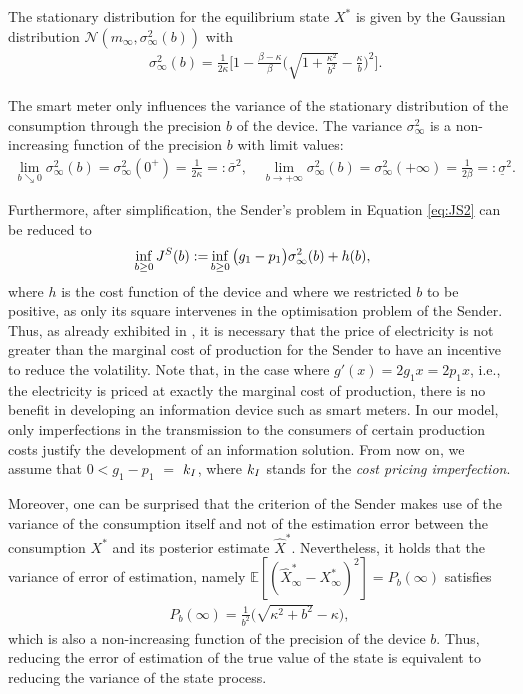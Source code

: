 \documentclass[a4paper,10pt]{article}
\theoremstyle{definition}
\theoremstyle{plain}
\numberwithin{equation}{section}
\begin{document}
\medskip

The stationary distribution for the equilibrium state $X^*$ is given by the Gaussian distribution $\mathcal{N}(m_\infty, \sigma_\infty^2(b))$ with
\begin{align}
 & \sigma_\infty^2(b) = \frac{1}{2\kappa} \Big[1-\frac{\beta-\kappa}{\beta}\Big(\sqrt{1 + \frac{\kappa^2}{b^2}} -  \frac{\kappa}{b}\Big)^2\Big].
\end{align}

The smart meter only influences the variance of the stationary distribution of the consumption through the precision $b$ of the device. The variance $\sigma_\infty^2$ is a non-increasing function of the precision $b$ with limit values: 
\begin{align}\label{eq:sigmalim}
	\lim_{b\searrow0}\sigma_\infty^2(b)=\sigma_\infty^2(0^+) = \frac{1}{2\kappa} =: \bar\sigma^2, 
	\quad 
	\lim_{b\to+\infty}\sigma_\infty^2(b)=\sigma_\infty^2(+\infty) =  \frac{1}{2\beta} =: \underline\sigma^2. 
\end{align}

Furthermore, after simplification, the Sender's problem in Equation \eqref{eq:JS2} can be reduced to
\begin{align}\label{eq:JSred}
 \inf_{b\geq 0} J^{\rm S} (b) := &  \inf_{b\geq 0}   \big(g_1 -  p_1\big) \sigma_{\infty}^2(b)  + h(b),
\end{align}
where $h$ is the cost function of the device and where we restricted $b$ to be positive, as only its square intervenes in the optimisation problem of the Sender. Thus, as already exhibited in \cite{Aid23}, it is necessary that  the price of electricity is not greater than the marginal cost of production for the Sender to have an incentive to reduce the volatility. Note that, in the case where $g'(x) = 2 g_1 x = 2 p_1 x$, i.e., the electricity is priced at exactly the marginal cost of production, there is no benefit in developing an information device such as smart meters. In our model, only imperfections in the transmission to the consumers of certain production costs justify the development of an information solution. From now on, we assume that $0< g_1-p_1$ $=$ $k_{\rm I}$, where $k_{\rm I}$ stands for the {\em cost pricing imperfection}.


\medskip

Moreover, one can be surprised that the criterion of the Sender makes use of the variance of the consumption itself and not of the estimation error between the consumption $X^*$ and its posterior estimate $\widehat X^*$. Nevertheless, it holds that the variance of error of estimation, namely $\mathbb E[(\widehat X^*_\infty - X_\infty^*)^2] = P_b(\infty)$ satisfies
\begin{align*}
P_{b}(\infty)  = \frac{1}{b^2}\big(\sqrt{ \kappa^2 + b^2 } -\kappa\big),
\end{align*}
which is also a non-increasing function of the precision of the device $b$. Thus, reducing the error of estimation of the true value of the state is equivalent to reducing the variance of the state process.
\end{document}
